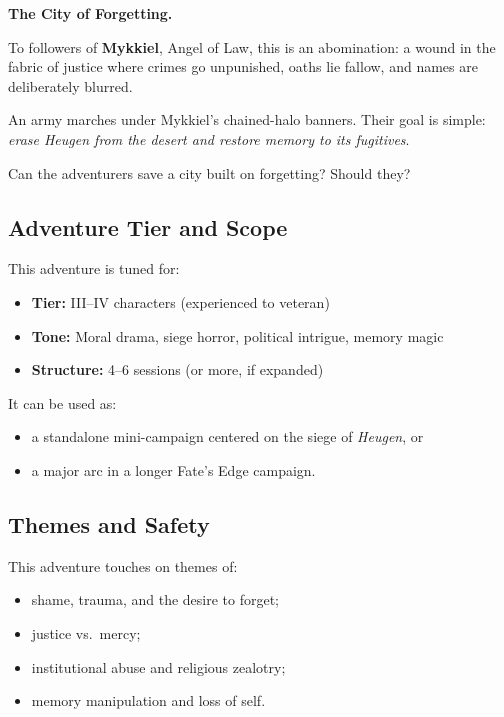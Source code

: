 \documentclass[11pt]{article}
\newcommand{\Term}[1]{\textbf{#1}}
\newcommand{\Place}[1]{\textit{#1}}
\begin{document}
\begin{center}
  \textbf{The City of Forgetting.}
\end{center}

To followers of \Term{Mykkiel}, Angel of Law, this is an abomination: a wound in the fabric of justice where crimes go unpunished, oaths lie fallow, and names are deliberately blurred.

An army marches under Mykkiel's chained-halo banners. Their goal is simple: \emph{erase Heugen from the desert and restore memory to its fugitives}.

Can the adventurers save a city built on forgetting? Should they?

\subsection*{Adventure Tier and Scope}

This adventure is tuned for:
\begin{itemize}[leftmargin=*]
  \item \textbf{Tier:} III--IV characters (experienced to veteran)
  \item \textbf{Tone:} Moral drama, siege horror, political intrigue, memory magic
  \item \textbf{Structure:} 4--6 sessions (or more, if expanded)
\end{itemize}

\noindent
It can be used as:
\begin{itemize}[leftmargin=*]
  \item a standalone mini-campaign centered on the siege of \Place{Heugen}, or
  \item a major arc in a longer Fate's Edge campaign.
\end{itemize}

\subsection*{Themes and Safety}

This adventure touches on themes of:
\begin{itemize}[leftmargin=*]
  \item shame, trauma, and the desire to forget;
  \item justice vs.\ mercy;
  \item institutional abuse and religious zealotry;
  \item memory manipulation and loss of self.
\end{itemize}
\end{document}
